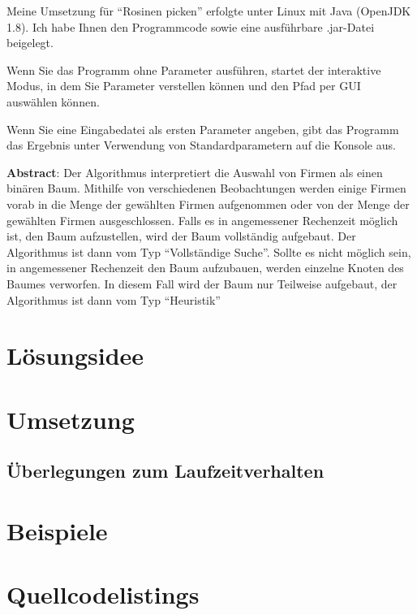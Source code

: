 \documentclass[a4paper, DIV=12, firstfoot=false, dvipsnames]{scrreprt}
\newcommand{\task}[1]{Rosinen picken}
\begin{document}
	\titlehead{Teilnahme 6745 (Team 00001) \hfill Laurenz Grote}
	\title{\task}
	\subtitle{Aufgabe 1}
	\author{Laurenz Friedrich Grote}
	\date{}
	\maketitle
	\tableofcontents
	\vspace {2em}
	Meine Umsetzung für "`\task{}"' erfolgte unter Linux mit Java (OpenJDK 1.8). Ich habe Ihnen den Programmcode sowie eine ausführbare .jar-Datei beigelegt.

	Wenn Sie das Programm ohne Parameter ausführen, startet der interaktive Modus, in dem Sie Parameter verstellen können und den Pfad per GUI auswählen können.

	Wenn Sie eine Eingabedatei als ersten Parameter angeben, gibt das Programm das Ergebnis unter Verwendung von Standardparametern auf die Konsole aus.

	\vfill{}
	\textbf{Abstract}:
	Der Algorithmus interpretiert die Auswahl von Firmen als einen binären Baum. Mithilfe von verschiedenen Beobachtungen werden einige Firmen vorab in die Menge der gewählten Firmen aufgenommen oder von der Menge der gewählten Firmen ausgeschlossen. Falls es in angemessener Rechenzeit möglich ist, den Baum aufzustellen, wird der Baum vollständig aufgebaut. Der Algorithmus ist dann vom Typ "`Vollständige Suche"'. Sollte es nicht möglich sein, in angemessener Rechenzeit den Baum aufzubauen, werden einzelne Knoten des Baumes verworfen. In diesem Fall wird der Baum nur Teilweise aufgebaut, der Algorithmus ist dann vom Typ "`Heuristik"' 

	\pagebreak
	\chapter{Lösungsidee}
		
	\chapter{Umsetzung}
		
		\section{Überlegungen zum Laufzeitverhalten}
			
	\chapter{Beispiele}
		
	\chapter{Quellcodelistings}
		
\end{document}
